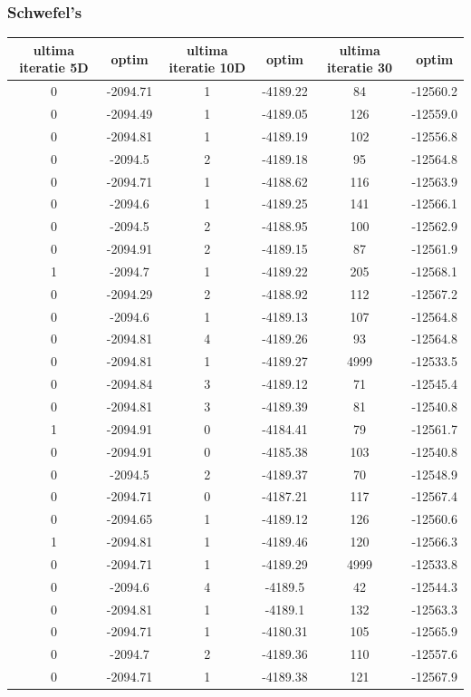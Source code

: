 \documentclass{article}
\begin{document}
\subsubsection{Schwefel’s}
\begin{tabular}{cccccc}
\hline
ultima iteratie 5D& optim&ultima iteratie 10D& optim&ultima iteratie 30&optim\\
\hline
0&-2094.71&1&-4189.22&84&-12560.2 \\ \hline
0&-2094.49&1&-4189.05&126&-12559.0 \\ \hline
0&-2094.81&1&-4189.19&102&-12556.8 \\ \hline
0&-2094.5&2&-4189.18&95&-12564.8 \\ \hline
0&-2094.71&1&-4188.62&116&-12563.9 \\ \hline
0&-2094.6&1&-4189.25&141&-12566.1 \\ \hline
0&-2094.5&2&-4188.95&100&-12562.9 \\ \hline
0&-2094.91&2&-4189.15&87&-12561.9 \\ \hline
1&-2094.7&1&-4189.22&205&-12568.1 \\ \hline
0&-2094.29&2&-4188.92&112&-12567.2 \\ \hline
0&-2094.6&1&-4189.13&107&-12564.8 \\ \hline
0&-2094.81&4&-4189.26&93&-12564.8 \\ \hline
0&-2094.81&1&-4189.27&4999&-12533.5 \\ \hline
0&-2094.84&3&-4189.12&71&-12545.4 \\ \hline
0&-2094.81&3&-4189.39&81&-12540.8 \\ \hline
1&-2094.91&0&-4184.41&79&-12561.7 \\ \hline
0&-2094.91&0&-4185.38&103&-12540.8 \\ \hline
0&-2094.5&2&-4189.37&70&-12548.9 \\ \hline
0&-2094.71&0&-4187.21&117&-12567.4 \\ \hline
0&-2094.65&1&-4189.12&126&-12560.6 \\ \hline
1&-2094.81&1&-4189.46&120&-12566.3 \\ \hline
0&-2094.71&1&-4189.29&4999&-12533.8 \\ \hline
0&-2094.6&4&-4189.5&42&-12544.3 \\ \hline
0&-2094.81&1&-4189.1&132&-12563.3 \\ \hline
0&-2094.71&1&-4180.31&105&-12565.9 \\ \hline
0&-2094.7&2&-4189.36&110&-12557.6 \\ \hline
0&-2094.71&1&-4189.38&121&-12567.9 \\ \hline

\end{tabular}
\end{document}
